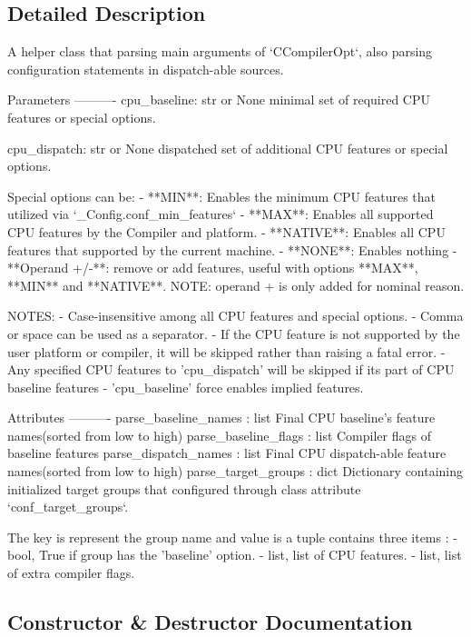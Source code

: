 \subsection{Detailed Description}
\begin{DoxyVerb}A helper class that parsing main arguments of `CCompilerOpt`,
also parsing configuration statements in dispatch-able sources.

Parameters
----------
cpu_baseline: str or None
    minimal set of required CPU features or special options.

cpu_dispatch: str or None
    dispatched set of additional CPU features or special options.

Special options can be:
    - **MIN**: Enables the minimum CPU features that utilized via `_Config.conf_min_features`
    - **MAX**: Enables all supported CPU features by the Compiler and platform.
    - **NATIVE**: Enables all CPU features that supported by the current machine.
    - **NONE**: Enables nothing
    - **Operand +/-**: remove or add features, useful with options **MAX**, **MIN** and **NATIVE**.
        NOTE: operand + is only added for nominal reason.

NOTES:
    - Case-insensitive among all CPU features and special options.
    - Comma or space can be used as a separator.
    - If the CPU feature is not supported by the user platform or compiler,
      it will be skipped rather than raising a fatal error.
    - Any specified CPU features to 'cpu_dispatch' will be skipped if its part of CPU baseline features
    - 'cpu_baseline' force enables implied features.

Attributes
----------
parse_baseline_names : list
    Final CPU baseline's feature names(sorted from low to high)
parse_baseline_flags : list
    Compiler flags of baseline features
parse_dispatch_names : list
    Final CPU dispatch-able feature names(sorted from low to high)
parse_target_groups : dict
    Dictionary containing initialized target groups that configured
    through class attribute `conf_target_groups`.

    The key is represent the group name and value is a tuple
    contains three items :
        - bool, True if group has the 'baseline' option.
        - list, list of CPU features.
        - list, list of extra compiler flags.\end{DoxyVerb}
 

\subsection{Constructor \& Destructor Documentation}
\mbox{\label{classnumpy_1_1distutils_1_1ccompiler__opt_1_1__Parse_a3e565e0727ad1875f0ecb204c8e36fac}} 
